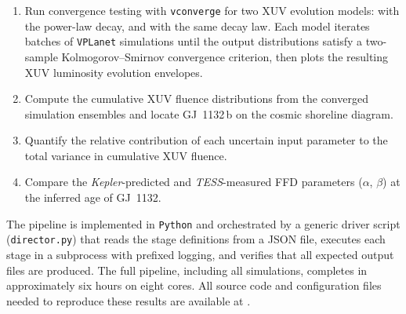 \begin{enumerate}
\item Run convergence testing with \texttt{vconverge} for two XUV
evolution models: \citet{Engle24} with the \citet{Barnes20} power-law
decay, and \citet{Ribas05} with the same decay law. Each model
iterates batches of \texttt{VPLanet} \citep{Barnes20} simulations
until the output distributions satisfy a two-sample
Kolmogorov--Smirnov convergence criterion, then plots the resulting
XUV luminosity evolution envelopes.

\item Compute the cumulative XUV fluence distributions from the
converged simulation ensembles and locate GJ~1132\,b on the cosmic
shoreline diagram.

\item Quantify the relative contribution of each uncertain input
parameter to the total variance in cumulative XUV fluence.

\item Compare the \emph{Kepler}-predicted and \emph{TESS}-measured
FFD parameters ($\alpha$, $\beta$) at the inferred age of GJ~1132.

\end{enumerate}

The pipeline is implemented in \texttt{Python} and orchestrated by a
generic driver script (\texttt{director.py}) that reads the stage
definitions from a JSON file, executes each stage in a subprocess with
prefixed logging, and verifies that all expected output files are
produced. The full pipeline, including all simulations, completes in
approximately six hours on eight cores. All source code and
configuration files needed to reproduce these results are available at
.
